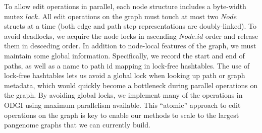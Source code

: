 \documentclass{bioinfo}
\begin{document}
To allow edit operations in parallel, each node structure includes a byte-width mutex $lock$.
All edit operations on the graph must touch at most two $Node$ structs at a time (both edge and path step representations are doubly-linked).
To avoid deadlocks, we acquire the node locks in ascending $Node.id$ order and release them in desceding order.
In addition to node-local features of the graph, we must maintain some global information.
Specifically, we record the start and end of paths, as well as a name to path id mapping in lock-free hashtables.
The use of lock-free hashtables lets us avoid a global lock when looking up path or graph metadata, which would quickly become a bottleneck during parallel operations on the graph.
By avoiding global locks, we implement many of the operations in ODGI using maximum parallelism available.
This ``atomic'' approach to edit operations on the graph is key to enable our methods to scale to the largest pangenome graphs that we can currently build.

\begin{comment}

In the variation graph model, paths have to respect the graph’s topology: this can be verified with odgi validate, to ensure no errors in the input or edited graphs.
In variation graphs the coordinates are provided by the embedded path sequences.
Indeed, the node IDs are not meant to be stable. odgi position finds, translates, and liftovers graph and path positions between different graphs by exploiting their shared path sequences (Figure 1.B).
\end{comment}

\begin{comment}
key message of the paper is that we have collected a set of algorithms that enable easy use of pangenome graphs for investigating biology
-> build model solves problem of working with big graphs in memory
-> view (convert to GFA) & paths solve problem of exporting basic features of the graph (e.g. paths)
-> stats (understand basic size / structure) & bin & degree & depth solves problem of understanding the overall structure and size of the graph
-> sort (groom) & layout solves problem of finding latent structure in the pangenome
-> viz & draw provides a human-viewable readout of the graph
-> chop & unchop & squeeze & break & prune & explode lets us break apart or combine the graph nodes and topology
-> position & tips & untangle (jaccard based coordinate conversion) provides a way to map coordinates between any genomes in the graph (e.g. liftover!)
-> extract lets us pull out specific regions of the graph based on path ranges, nodes and positions
\end{comment}
\end{document}
